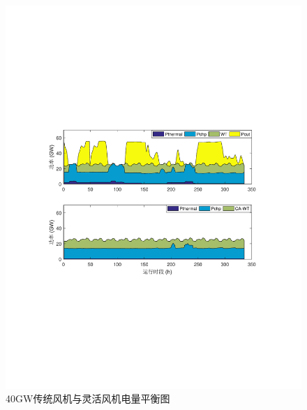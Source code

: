 \begin{figure}[H] %
  \centering
  \includegraphics[scale=0.85]{figures/Chap5-Power-Balance-40G-WT.pdf}
  \caption{40GW传统风机与灵活风机电量平衡图}
  \label{fig:Power-Balance-40G-WT}
\end{figure}

